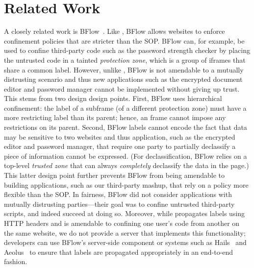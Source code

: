 \section{Related Work}
\label{sec:related}

A closely related work is BFlow~\cite{Yip:2009:PBS}.
%
Like \sys{}, BFlow allows websites to enforce confinement policies
that are stricter than the SOP.
%
BFlow can, for example, be used to confine third-party code such as
the password strength checker by placing the untrusted code in a
tainted \emph{protection zone}, which is a group of iframes that share
a common label.
%
However, unlike \sys{}, BFlow is not amendable to a mutually
distrusting scenario and thus new applications such as the encrypted
document editor and password manager cannot be implemented without
giving up trust.
%
This stems from two design design points.
%
First, BFlow uses hierarchical confinement: the label of a subframe
(of a different protection zone) must have a more restricting label
than its parent; hence, an frame cannot impose any restrictions on its
parent.
%
Second, BFlow labels cannot encode the fact that data may be sensitive
to two websites and thus application, such as the encrypted editor and
password manager, that require one party to partially declassify a
piece of information cannot be expressed.
%
(For declassification, BFlow relies on a top-level \emph{trusted zone}
that can always \emph{completely} declassify the data in the page.)
%
This latter design point further prevents BFlow from being amendable
to building applications, such as our third-party mashup, that rely on
a policy more flexible than the SOP.
%
In fairness, BFlow did not consider applications with mutually
distrusting parties---their goal was to confine untrusted third-party
scripts, and indeed succeed at doing so.
%
Moreover, while \sys{} propagates labels using HTTP headers and is
amendable to confining one user's code from another on the same
website, we do not provide a server that implements this
functionality; developers can use BFlow's server-side component or
systems such as Hails~\cite{giffin:2012:hails} and
Aeolus~\cite{cheng:aeolus} to ensure that labels are propagated
appropriately in an end-to-end fashion.
%



